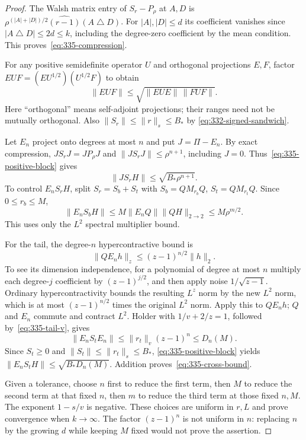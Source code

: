 \documentclass[11pt]{article}
\begin{document}
\begin{proof}
The Walsh matrix entry of $S_r-P_\rho$ at $A,D$ is
$\rho^{(|A|+|D|)/2}\widehat{(r-1)}(A\mathbin\triangle D)$.
For $|A|,|D|\le d$ its coefficient vanishes since
$|A\mathbin\triangle D|\le2d\le k$, including the degree-zero
coefficient by the mean condition. This proves~\eqref{eq:335-compression}.

For any positive semidefinite operator $U$ and orthogonal projections
$E,F$, factor $EUF=(EU^{1/2})(U^{1/2}F)$ to obtain
\begin{equation}\label{eq:335-positive-block}
 \|EUF\|\le\sqrt{\|EUE\|\,\|FUF\|}.
\end{equation}
Here ``orthogonal'' means self-adjoint projections; their ranges need
not be mutually orthogonal. Also
$\|S_r\|\le\|r\|_s\le B_*$ by
\eqref{eq:332-signed-sandwich}.

Let $E_n$ project onto degrees at most $n$ and put $J=\Pi-E_n$.
By exact compression,
$JS_rJ=JP_\rho J$ and $\|JS_rJ\|\le\rho^{n+1}$, including $J=0$.
Thus~\eqref{eq:335-positive-block} gives
\[
 \|JS_rH\|\le\sqrt{B_*\rho^{n+1}}.
\]
To control $E_nS_rH$, split $S_r=S_b+S_t$ with
$S_b=QM_{r_b}Q$, $S_t=QM_{r_t}Q$. Since $0\le r_b\le M$,
\[
 \|E_nS_bH\|\le M\|E_nQ\|\|QH\|_{2\to2}
 \le M\rho^{m/2}.
\]
This uses only the $L^2$ spectral multiplier bound.

For the tail, the degree-$n$ hypercontractive bound is
\[
 \|QE_nh\|_z\le(z-1)^{n/2}\|h\|_2.
\]
To see its dimension independence, for a polynomial of degree at most
$n$ multiply each degree-$j$ coefficient by $(z-1)^{j/2}$, and then
apply noise $1/\sqrt{z-1}$. Ordinary hypercontractivity bounds the
resulting $L^z$ norm by the new $L^2$ norm, which is at most
$(z-1)^{n/2}$ times the original $L^2$ norm. Apply this to $QE_nh$;
$Q$ and $E_n$ commute and contract $L^2$.
Holder with $1/v+2/z=1$, followed by~\eqref{eq:335-tail-v}, gives
\[
 \|E_nS_tE_n\|\le\|r_t\|_v(z-1)^n\le D_n(M).
\]
Since $S_t\ge0$ and $\|S_t\|\le\|r_t\|_s\le B_*$,
\eqref{eq:335-positive-block} yields
$\|E_nS_tH\|\le\sqrt{B_*D_n(M)}$.
Addition proves~\eqref{eq:335-cross-bound}.

Given a tolerance, choose $n$ first to reduce the first term, then $M$
to reduce the second term at that fixed $n$, then $m$ to reduce the
third term at those fixed $n,M$. The exponent $1-s/v$ is negative.
These choices are uniform in $r,L$ and prove convergence when $k\to\infty$.
The factor $(z-1)^n$ is not uniform in $n$: replacing $n$ by the growing
$d$ while keeping $M$ fixed would not prove the assertion.
\end{proof}
\end{document}
